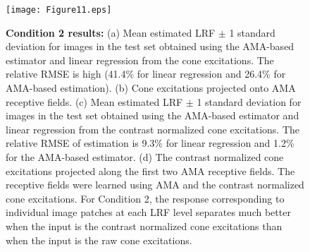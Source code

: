 \documentclass{jov}
\begin{document}
\begin{figure}
\centering
\texttt{[image: Figure11.eps]}
    \caption{{\bf Condition 2 results:} (a) Mean estimated LRF $\pm$ 1 standard deviation for images in the test set obtained using the AMA-based estimator and linear regression from the cone excitations. The relative RMSE is high (41.4\% for linear regression and 26.4\% for AMA-based estimation). (b) Cone excitations projected onto AMA receptive fields. (c) Mean estimated LRF $\pm$ 1 standard deviation for images in the test set obtained using the AMA-based estimator and linear regression from the contrast normalized cone excitations. The relative RMSE of estimation is 9.3\% for linear regression and 1.2\% for the AMA-based estimator. (d) The contrast normalized cone excitations projected along the first two AMA receptive fields. The receptive fields were learned using AMA and the contrast normalized cone excitations. For Condition 2, the response corresponding to individual image patches at each LRF level separates much better when the input is the contrast normalized cone excitations than when the input is the raw cone excitations.}
\label{fig:Condition2}
\end{figure}
\end{document}
